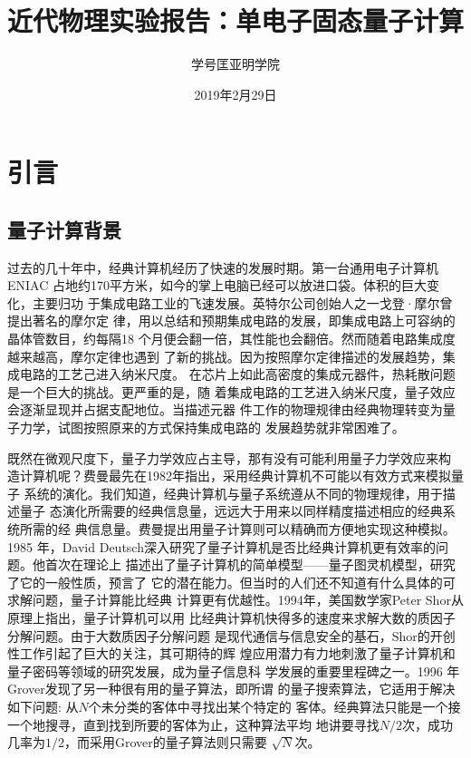 \documentclass[a4paper]{article}
\title{近代物理实验报告：单电子固态量子计算}
\author{\quad 学号\quad 匡亚明学院}
\date{2019年2月29日}
\begin{document}
\maketitle


\tableofcontents
\newpage

\section{引言}


\subsection{量子计算背景}
过去的几十年中，经典计算机经历了快速的发展时期。第一台通用电子计算机ENIAC
占地约170平方米，如今的掌上电脑已经可以放进口袋。体积的巨大变化，主要归功
于集成电路工业的飞速发展。英特尔公司创始人之一戈登·摩尔曾提出著名的摩尔定
律，用以总结和预期集成电路的发展，即集成电路上可容纳的晶体管数目，约每隔18
个月便会翻一倍，其性能也会翻倍。然而随着电路集成度越来越高，摩尔定律也遇到
了新的挑战。因为按照摩尔定律描述的发展趋势，集成电路的工艺己进入纳米尺度。
在芯片上如此高密度的集成元器件，热耗散问题是一个巨大的挑战。更严重的是，随
着集成电路的工艺进入纳米尺度，量子效应会逐渐显现并占据支配地位。当描述元器
件工作的物理规律由经典物理转变为量子力学，试图按照原来的方式保持集成电路的
发展趋势就非常困难了。

既然在微观尺度下，量子力学效应占主导，那有没有可能利用量子力学效应来构
造计算机呢？费曼最先在1982年指出，采用经典计算机不可能以有效方式来模拟量子
系统的演化。我们知道，经典计算机与量子系统遵从不同的物理规律，用于描述量子
态演化所需要的经典信息量，远远大于用来以同样精度描述相应的经典系统所需的经
典信息量。费曼提出用量子计算则可以精确而方便地实现这种模拟。1985 年，David
Deutsch深入研究了量子计算机是否比经典计算机更有效率的问题。他首次在理论上
描述出了量子计算机的简单模型——量子图灵机模型，研究了它的一般性质，预言了
它的潜在能力。但当时的人们还不知道有什么具体的可求解问题，量子计算能比经典
计算更有优越性。1994年，美国数学家Peter Shor从原理上指出，量子计算机可以用
比经典计算机快得多的速度来求解大数的质因子分解问题。由于大数质因子分解问题
是现代通信与信息安全的基石，Shor的开创性工作引起了巨大的关注，其可期待的辉
煌应用潜力有力地刺激了量子计算机和量子密码等领域的研究发展，成为量子信息科
学发展的重要里程碑之一。1996 年Grover发现了另一种很有用的量子算法，即所谓
的量子搜索算法，它适用于解决如下问题: 从$ N $个未分类的客体中寻找出某个特定的
客体。经典算法只能是一个接一个地搜寻，直到找到所要的客体为止，这种算法平均
地讲要寻找$ N/2 $次，成功几率为$ 1/2 $，而采用Grover的量子算法则只需要
$ \sqrt{N} $次。
\end{document}
